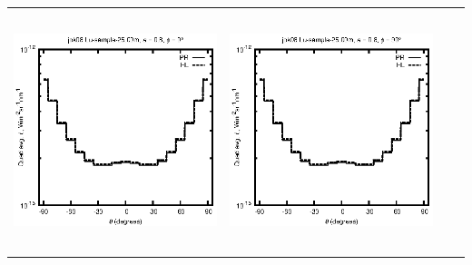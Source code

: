 \documentclass[10pt,a4paper]{article}
\begin{document}
\begin{adjustwidth}{-1.2in}{-1.2in}
\begin{tabular}{c c c c}
\includegraphics[height=7cm]{../eps/jok08_Lu_sample_25.00m_fwd.eps} &
\includegraphics[height=7cm]{../eps/jok08_Lu_sample_25.00m_cross.eps} \\
\end{tabular}

\pagebreak


\end{adjustwidth}
\end{document}
